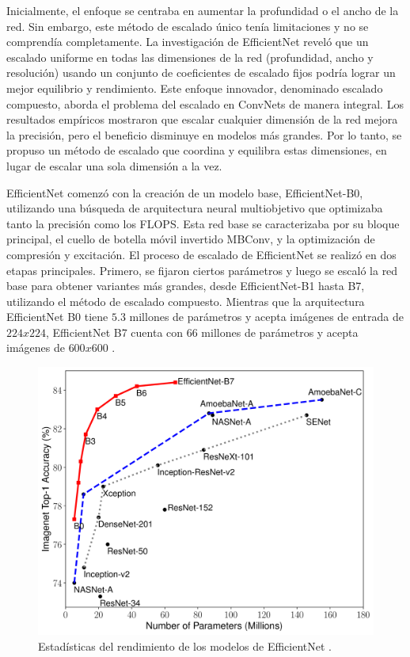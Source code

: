 Inicialmente, el enfoque se centraba en aumentar la profundidad o el ancho de la red. Sin embargo, este método de escalado único tenía limitaciones y no se comprendía completamente. La investigación de EfficientNet reveló que un escalado uniforme en todas las dimensiones de la red (profundidad, ancho y resolución) usando un conjunto de coeficientes de escalado fijos podría lograr un mejor equilibrio y rendimiento. Este enfoque innovador, denominado escalado compuesto, aborda el problema del escalado en ConvNets de manera integral. Los resultados empíricos mostraron que escalar cualquier dimensión de la red mejora la precisión, pero el beneficio disminuye en modelos más grandes. Por lo tanto, se propuso un método de escalado que coordina y equilibra estas dimensiones, en lugar de escalar una sola dimensión a la vez.

EfficientNet comenzó con la creación de un modelo base, EfficientNet-B0, utilizando una búsqueda de arquitectura neural multiobjetivo que optimizaba tanto la precisión como los FLOPS. Esta red base se caracterizaba por su bloque principal, el cuello de botella móvil invertido MBConv, y la optimización de compresión y excitación. El proceso de escalado de EfficientNet se realizó en dos etapas principales. Primero, se fijaron ciertos parámetros y luego se escaló la red base para obtener variantes más grandes, desde EfficientNet-B1 hasta B7, utilizando el método de escalado compuesto. Mientras que la arquitectura EfficientNet B0 tiene $5.3$ millones de parámetros y acepta imágenes de entrada de $224x224$, EfficientNet B7 cuenta con $66$ millones de parámetros y acepta imágenes de $600x600$ .
  
   \begin{figure}[H]
      \begin{center}
      \includegraphics[width=1\textwidth]{./Graphics/efficientnet_performance.png}
      \caption{Estadísticas del rendimiento de los modelos de EfficientNet .}
      \label{fig:efficientnet_performance}
      \end{center}
      \end{figure}

